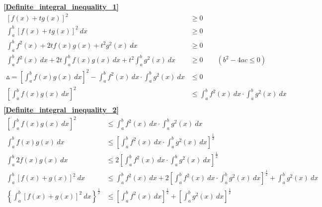\textbf{\large \ref{Definite_integral_inequality_1}}
\begin{align*}
	\left[f(x)+tg(x)\right]^2 &\geqslant 0\\
	\int_{a}^{b}\left[f(x)+tg(x)\right]^2\ dx&\geqslant 0\\
	\int_{a}^{b}f^2(x)+2tf(x)g(x)+t^2g^2(x)\ dx&\geqslant 0\\
	\int_{a}^{b}f^2(x)\ dx+2t\int_{a}^{b}f(x)g(x)\ dx+t^2\int_{a}^{b}g^2(x)\ dx&\geqslant 0\qquad(b^2-4ac\leqslant 0)\\
	\vartriangle =\left[\int_{a}^{b}f(x)g(x)\ dx\right]^2-\int_{a}^{b}f^2(x)\ dx\cdot \int_{a}^{b}g^2(x)\ dx&\leqslant 0\\
	\left[\int_{a}^{b}f(x)g(x)\ dx\right]^2 &\leqslant \int_{a}^{b}f^2(x)\ dx\cdot \int_{a}^{b}g^2(x)\ dx \\
\end{align*}
\textbf{\large \ref{Definite_integral_inequality_2}}
\begin{align*}
	\left[\int_{a}^{b}f(x)g(x)\ dx\right]^2&\leqslant \int_{a}^{b}f^2(x)\ dx\cdot \int_{a}^{b}g^2(x)\ dx\\
	\int_{a}^{b}f(x)g(x)\ dx&\leqslant \left[\int_{a}^{b}f^2(x)\ dx\cdot \int_{a}^{b}g^2(x)\ dx\right]^{\frac{1}{2}}\\
	\int_{a}^{b}2f(x)g(x)\ dx&\leqslant 2\left[\int_{a}^{b}f^2(x)\ dx\cdot \int_{a}^{b}g^2(x)\ dx\right]^{\frac{1}{2}}\\
	\int_{a}^{b}\left[f(x)+g(x)\right]^2 \ dx&\leqslant \int_{a}^{b}f^2(x)\ dx+2\left[\int_{a}^{b}f^2(x)\ dx\cdot 
	\int_{a}^{b}g^2(x)\ dx\right]^{\frac{1}{2}}+\int_{a}^{b}g^2(x)\ dx\\
	\left\{\int_{a}^{b}\left[f(x)+g(x)\right]^2 \ dx\right\}^{\frac{1}{2}}&\leqslant \left[\int_{a}^{b}f^2(x)\ dx\right]^{\frac{1}{2}}+\left[\int_{a}^{b}g^2(x)\ dx\right]^{\frac{1}{2}}
\end{align*}
